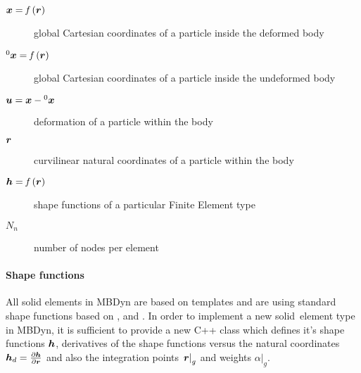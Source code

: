 \begin{description}
\item[$\bm{x}=\mathit{f}\left(\bm{r}\right)$] global Cartesian coordinates of a particle inside the deformed body
\item[$^0\bm{x}=\mathit{f}\left(\bm{r}\right)$] global Cartesian coordinates of a particle inside the undeformed body
\item[$\bm{u}=\bm{x}-{^0}\bm{x}$] deformation of a particle within the body
\item[$\bm{r}$] curvilinear natural coordinates of a particle within the body
\item[$\bm{h}=\mathit{f}\left(\bm{r}\right)$] shape functions of a particular Finite Element type
\item[$N_n$] number of nodes per element
\end{description}

\paragraph{Shape functions}
All solid elements in MBDyn are based on templates and are using standard shape functions based on \cite{BATHE2016}, \cite{DHONDT2004} and \cite{CODEASTERR30301}.
In order to implement a new solid~element type in MBDyn, it is sufficient to provide a new C++ class which defines it's shape functions $\bm{h}$,
derivatives of the shape functions versus the natural coordinates $\bm{h}_d=\frac{\partial \bm{h}}{\partial \bm{r}}$ and also the integration points $\left.\bm{r}\right\vert_g$ and weights $\left.\alpha\right\vert_g$.

